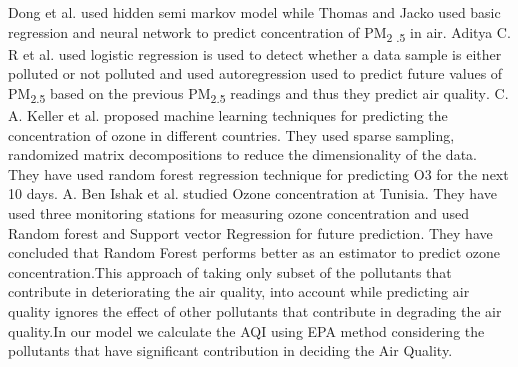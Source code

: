 \documentclass{article}
\begin{document}
\begin{itemize}
Dong et al. \textsuperscript{\cite{ref12}} used hidden semi markov
model while Thomas and Jacko \textsuperscript{\cite{ref13}} used basic regression and neural network to predict concentration of  PM\textsubscript{2 .5} in air.
Aditya C. R et al. used logistic regression is used to detect whether a data sample is either polluted or not polluted and used autoregression used to predict future values of PM\textsubscript{2.5} based on the previous PM\textsubscript{2.5} readings and thus they predict air quality\textsuperscript{\cite{ref17}}.
C. A. Keller et al.
proposed machine learning techniques for predicting the concentration of ozone in different countries. They used sparse sampling,
randomized matrix decompositions to
reduce the dimensionality of the data. They have used random forest regression technique for predicting O3 for the next 10 days\textsuperscript{\cite{ref22}}.
A. Ben Ishak et al. studied Ozone concentration at Tunisia. They have used three monitoring stations
for measuring ozone concentration and used Random forest
and Support vector Regression for future prediction. 
They have concluded that Random Forest performs better as an estimator to predict ozone concentration\textsuperscript{\cite{ref24 }}.This approach of taking only subset of the pollutants that contribute in deteriorating the air quality, into account while predicting air quality ignores the effect of other pollutants that contribute in degrading the air quality.In our model we calculate the AQI using EPA method considering the pollutants that have significant contribution in deciding the Air Quality.\\ \\


\end{itemize}
\end{document}

